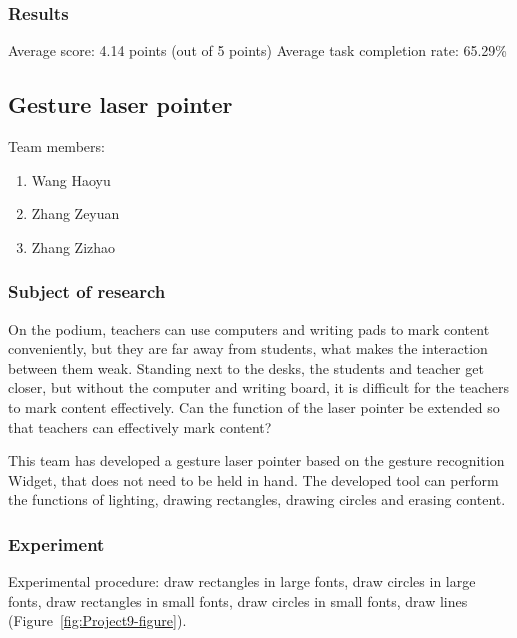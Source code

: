 \subsubsection{Results}

Average score: 4.14 points (out of 5 points)
Average task completion rate: 65.29\%

\subsection{Gesture laser pointer}

Team members:
\begin{enumerate}
    \item Wang Haoyu
    \item Zhang Zeyuan 
    \item Zhang Zizhao
\end{enumerate}


\subsubsection{Subject of research}
On the podium, teachers can use computers and writing pads to mark content conveniently, but they are far away from students, what makes the interaction between them weak.
Standing next to the desks, the students and teacher get closer, but without the computer and writing board, it is difficult for the teachers to mark content effectively.
Can the function of the laser pointer be extended so that teachers can effectively mark content? 

This team has developed a gesture laser pointer based on the gesture recognition Widget, that does not need to be held in hand.
The developed tool can perform the functions of lighting, drawing rectangles, drawing circles and erasing content.

\subsubsection{Experiment}

Experimental procedure: draw rectangles in large fonts, draw circles in large fonts, draw rectangles in small fonts, draw circles in small fonts, draw lines (Figure~\ref{fig:Project9-figure}). 


